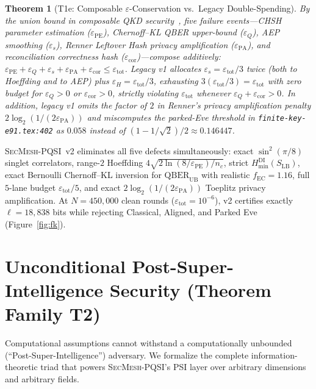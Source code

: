 \documentclass[11pt,reqno]{amsart}
\newtheorem{theorem}{Theorem}[section]
\theoremstyle{definition}
\newcommand{\QBER}{\mathrm{QBER}}
\newcommand{\Hmin}{H_{\min}^{\mathrm{DI}}}
\newcommand{\code}[1]{\texttt{\small #1}}
\begin{document}
\begin{theorem}[T1e: Composable $\varepsilon$-Conservation vs.\ Legacy Double-Spending]
\label{thm:t1e}
By the union bound in composable QKD security~\cite{renner2008,tomamichel2012}, five failure events---CHSH parameter estimation ($\varepsilon_{\mathrm{PE}}$), Chernoff--KL QBER upper-bound ($\varepsilon_Q$), AEP smoothing ($\varepsilon_s$), Renner Leftover Hash privacy amplification ($\varepsilon_{\mathrm{PA}}$), and reconciliation correctness hash ($\varepsilon_{\mathrm{cor}}$)---compose additively: $\varepsilon_{\mathrm{PE}} + \varepsilon_Q + \varepsilon_s + \varepsilon_{\mathrm{PA}} + \varepsilon_{\mathrm{cor}} \le \varepsilon_{\mathrm{tot}}$.
Legacy v1 allocates $\varepsilon_s = \varepsilon_{\mathrm{tot}}/3$ twice (both to Hoeffding and to AEP) plus $\varepsilon_H = \varepsilon_{\mathrm{tot}}/3$, exhausting $3(\varepsilon_{\mathrm{tot}}/3) = \varepsilon_{\mathrm{tot}}$ with zero budget for $\varepsilon_Q > 0$ or $\varepsilon_{\mathrm{cor}} > 0$, strictly violating $\varepsilon_{\mathrm{tot}}$ whenever $\varepsilon_Q + \varepsilon_{\mathrm{cor}} > 0$.
In addition, legacy v1 omits the factor of $2$ in Renner's privacy amplification penalty $2\log_2(1/(2\varepsilon_{\mathrm{PA}}))$ and miscomputes the parked-Eve threshold in \code{finite-key-e91.tex:402} as $0.058$ instead of $(1 - 1/\sqrt{2})/2 \approx 0.146447$.
\end{theorem}

\textsc{SecMesh-PQSI}~v2 eliminates all five defects simultaneously: exact $\sin^2(\pi/8)$ singlet correlators, range-$2$ Hoeffding $4\sqrt{2\ln(8/\varepsilon_{\mathrm{PE}})/n_c}$, strict $\Hmin(S_{\mathrm{LB}})$, exact Bernoulli Chernoff--KL inversion for $\QBER_{\mathrm{UB}}$ with realistic $f_{\mathrm{EC}} = 1.16$, full $5$-lane budget $\varepsilon_{\mathrm{tot}}/5$, and exact $2\log_2(1/(2\varepsilon_{\mathrm{PA}}))$ Toeplitz privacy amplification. At $N = 450{,}000$ clean rounds ($\varepsilon_{\mathrm{tot}}=10^{-6}$), v2 certifies exactly $\ell = 18{,}838$ bits while rejecting Classical, Aligned, and Parked Eve (Figure~\ref{fig:fk}).

\section{Unconditional Post-Super-Intelligence Security (Theorem Family T2)}
\label{sec:psi}

Computational assumptions cannot withstand a computationally unbounded (``Post-Super-Intelligence'') adversary.
We formalize the complete information-theoretic triad that powers \textsc{SecMesh-PQSI}'s PSI layer over arbitrary dimensions and arbitrary fields.
\end{document}
